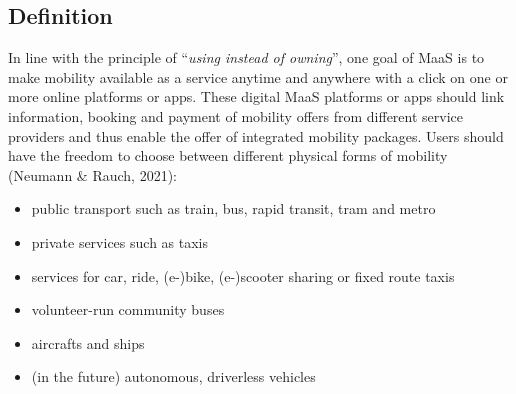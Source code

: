 \documentclass[
]{book}
\providecommand{\tightlist}{%
  \setlength{\itemsep}{0pt}\setlength{\parskip}{0pt}}
\begin{document}
\hypertarget{definition-10}{%
\subsection*{Definition}\label{definition-10}}

In line with the principle of ``\emph{using instead of owning}'', one goal of MaaS is to make mobility available as a service anytime and anywhere with a click on one or more online platforms or apps. These digital MaaS platforms or apps should link information, booking and payment of mobility offers from different service providers and thus enable the offer of integrated mobility packages. Users should have the freedom to choose between different physical forms of mobility (Neumann \& Rauch, 2021):

\begin{itemize}
\tightlist
\item
  public transport such as train, bus, rapid transit, tram and metro
\item
  private services such as taxis
\item
  services for car, ride, (e-)bike, (e-)scooter sharing or fixed route taxis
\item
  volunteer-run community buses
\item
  aircrafts and ships
\item
  (in the future) autonomous, driverless vehicles
\end{itemize}
\end{document}

